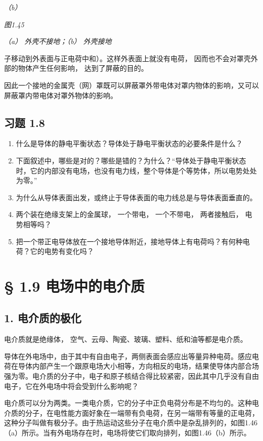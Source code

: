 \emph{（b）}

\emph{图1.45}

\emph{（a） 外壳不接地；（b） 外壳接地}

子移动到外表面与正电荷中和）。这样外表面上就没有电荷，
因而也不会对罩壳外部的物体产生任何影响， 达到了屏蔽的目的。

因此一个接地的金属壳（网）罩既可以屏蔽罩外带电体对罩内物体的影响，又可以屏蔽罩内带电体对罩外物体的影响。

\subsection{习题 1.8}\label{ux4e60ux9898-1.8}

\begin{enumerate}
\def\labelenumi{\arabic{enumi}.}
\item
  什么是导体的静电平衡状态？导体处于静电平衡状态的必要条件是什么？
\item
  下面叙述中，哪些是对的？哪些是错的？为什么？``导体处于静电平衡状态时，它的内部没有电场，也没有电力线，整个导体是个等势体，所以电势处处为零。''
\item
  为什么从导体表面出发，或终止于导体表面的电力线总是与导体表面垂直的。
\item
  两个装在绝缘支架上的金属球， 一个带电， 一个不带电， 两者接触后，
  电势相等吗？
\item
  把一个带正电导体放在一个接地导体附近，接地导体上有电荷吗？有何种电荷？它的电势有变化吗？
\end{enumerate}

\section{§ 1.9
电场中的电介质}\label{ux7535ux573aux4e2dux7684ux7535ux4ecbux8d28}

\subsection{1. 电介质的极化}\label{ux7535ux4ecbux8d28ux7684ux6781ux5316}

电介质就是绝缘体， 空气、云母、陶瓷、玻璃、塑料、纸和油等都是电介质。

导体在外电场中，由于其中有自由电子，两侧表面会感应出等量异种电荷。感应电荷在导体内部产生一个跟原电场大小相等，方向相反的电场，结果使导体内部合场强为零。电介质的分子中，电子和原子核结合得比较紧密，因此其中几乎没有自由电子，它在外电场中将会受到什么影响呢？

电介质可以分为两类。一类电介质，它的分子中正负电荷分布是不均匀的。这种电介质的分子，在电性能方面好象在一端带有负电荷，在另一端带有等量的正电荷，这种分子叫做有极分子。由于热运动这些分子在电介质中是杂乱排列的，如图1.46（a）所示。当有外电场存在时，电场将使它们取向排列，如图1.46（b）所示。

